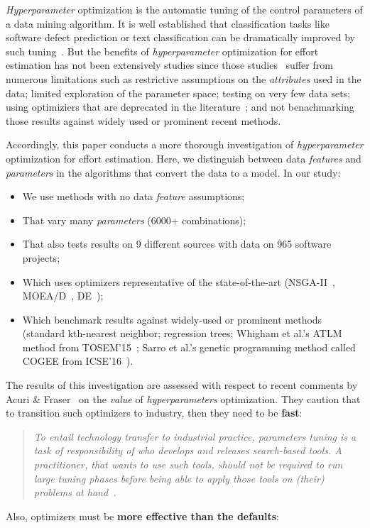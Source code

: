 \documentclass[10pt,conference]{IEEEtran}
\newcommand{\bi}{\begin{itemize}}
\newcommand{\ei}{\end{itemize}}
\begin{document}
{\em Hyperparameter} optimization  is the automatic tuning
of the control parameters of a data
mining algorithm.
It is well established that  classification tasks like software defect prediction or 
 text classification can be dramatically improved by such tuning~\cite{Fu2016TuningFS,tanti18,thornton2013auto,AGRAWAL2018,agrawal2017better}.
But the benefits of   {\em hyperparameter} optimization for   effort estimation has not been extensively
studies since those studies~\cite{dejaeger12,Moeyersoms:2015,li09,ekrem09,singh2012software,aljahdali2010software,Song:2013,IJST70010,Rao14,Khatibi13} suffer from  numerous
limitations such as   restrictive assumptions on  the {\em attributes} used in the data; limited exploration
of the parameter space; testing on very few data sets;
using optimiziers that are     deprecated  in the literature~\cite{Bergstra:2012};
and not benachmarking those results against widely used or prominent recent methods.

Accordingly, this paper conducts a  more thorough investigation of {\em hyperparameter} optimization for effort estimation. Here, we  distinguish between 
data {\em features} and {\em parameters} in the algorithms
that convert the data to a model.
In our study:
\bi
\item
We  use methods with no   data
{\em feature} assumptions;
\item
That
 vary
many {\em parameters} (6000+ combinations);
\item
That also  tests  results   on 9 different sources with data on 965 software projects; 
\item
Which  uses optimizers   representative of the  state-of-the-art 
(NSGA-II~\cite{deb02}, MOEA/D~\cite{Zhang07}, DE~\cite{storn1997differential});
\item
Which 
benchmark results 
against widely-used or prominent methods (standard kth-nearest neighbor;  regression trees;
  Whigham et al.'s ATLM method from TOSEM'15~\cite{Whigham:2015}; Sarro et al.'s genetic programming
 method called COGEE from ICSE'16~\cite{sarro2016multi}).
\ei
The results of this investigation are assessed   with respect to recent comments by 
Acuri \& Fraser~\cite{Arcuri2013} on the {\em value} of {\em hyperparameters} optimization.
They caution that to transition such optimizers  to industry, then they need to be {\bf  fast}:
\begin{quote}
{\em To entail technology transfer to industrial practice, {\em parameters} tuning is a task of responsibility of who develops and releases search-based tools.
A practitioner, that wants to use such tools, should not be required to run large tuning phases before being able to apply those tools on (their) problems at hand~\cite{Arcuri2013}.}
\end{quote}
Also,  optimizers must  be {\bf  more effective than the defaults}:
\end{document}
